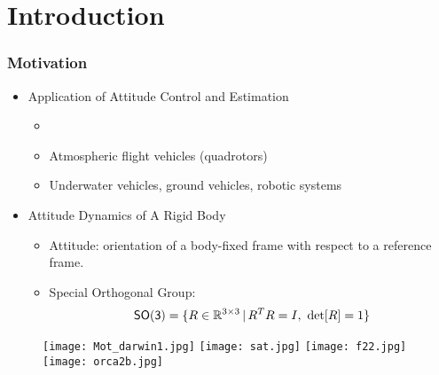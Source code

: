 

\section*{Introduction}  

\begin{frame} %
\frametitle{Motivation}
	\begin{itemize} 
	\item Application of Attitude Control and Estimation
		\begin{itemize} 
		\item {} 
		\vspace*{0.1cm} 
		\item Atmospheric flight vehicles (quadrotors)
		\vspace*{0.1cm} 
		\item Underwater vehicles, ground vehicles, robotic systems 
		\end{itemize}  
	\vspace*{0.3cm}
\pause	
	\item Attitude Dynamics of A Rigid Body  
		\begin{itemize} 
		\item Attitude: orientation of a body-fixed frame with respect to a reference frame.
		\vspace*{0.1cm} 
		\item Special Orthogonal Group:
	    	\begin{align*} %
	       	\SO = \{ R\in\Re^{3\times 3}\,|\, R^TR=I,~\mathrm{det}[R]=1\}
	       	\end{align*}		
		\end{itemize} 
	\end{itemize} 
        	\begin{figure} %
            \centerline{
            \texttt{[image: Mot\_darwin1.jpg]}\hspace*{0.3cm}
            \texttt{[image: sat.jpg]} \hspace*{0.3cm}
            \texttt{[image: f22.jpg]} \hspace*{0.3cm}
            \texttt{[image: orca2b.jpg]} 
            }
          	\end{figure}	
\end{frame}   %



